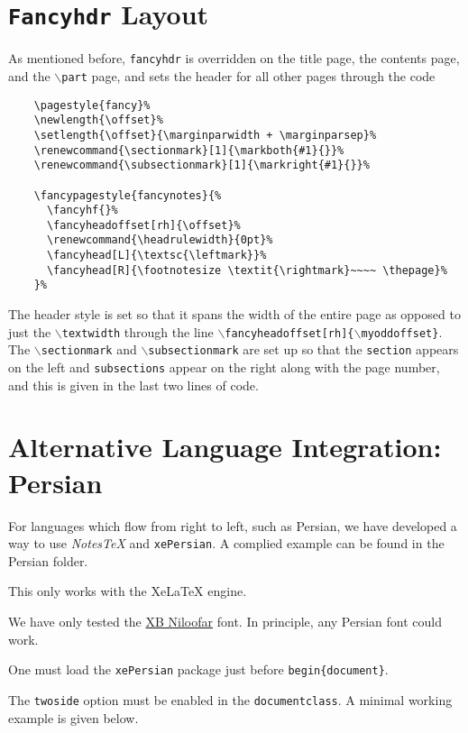 \documentclass[10pt]{article}
\begin{document}
	\section{\texttt{Fancyhdr} Layout}
	As mentioned before, \texttt{fancyhdr} is overridden on the title page, the contents page, and the \texttt{$\backslash$part} page, and sets the header for all other pages through the code
	\begin{verbatim}
	\pagestyle{fancy}%
	\newlength{\offset}%
	\setlength{\offset}{\marginparwidth + \marginparsep}%
	\renewcommand{\sectionmark}[1]{\markboth{#1}{}}%
	\renewcommand{\subsectionmark}[1]{\markright{#1}{}}%

	\fancypagestyle{fancynotes}{%
	  \fancyhf{}%
	  \fancyheadoffset[rh]{\offset}%
	  \renewcommand{\headrulewidth}{0pt}%
	  \fancyhead[L]{\textsc{\leftmark}}%
	  \fancyhead[R]{\footnotesize \textit{\rightmark}~~~~ \thepage}%
	}%
	\end{verbatim}
	The header style is set so that it spans the width of the entire page as opposed to just the \texttt{$\backslash$textwidth} through the line \texttt{$\backslash$fancyheadoffset[rh]\{$\backslash$myoddoffset\}}. The \texttt{$\backslash$sectionmark} and \texttt{$\backslash$subsectionmark} are set up so that the \texttt{section} appears on the left and \texttt{subsections} appear on the right along with the page number, and this is given in the last two lines of code.


	\section{Alternative Language Integration: Persian}
	For languages which flow from right to left, such as Persian, we have developed a way to use \textit{NotesTeX} and \texttt{xePersian}. A complied example can be found in the Persian folder.
	\begin{remark}
		This only works with the XeLaTeX engine.
	\end{remark}
	\begin{remark}
		We have only tested the \href{https://fontlibrary.org/en/font/xb-niloofar}{XB Niloofar} font. In principle, any Persian font could work.
	\end{remark}
	\begin{remark}
		One must load the \texttt{xePersian} package just before \texttt{begin\{document\}}.
	\end{remark}
	\noindent The \texttt{twoside} option must be enabled in the \texttt{documentclass}. A minimal working example is given below.
\end{document}
